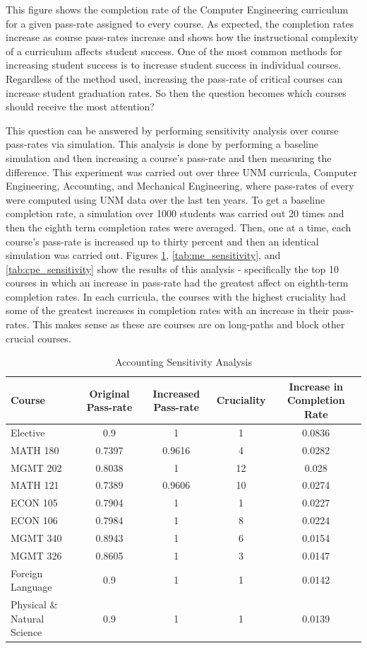 \documentclass[botnum, fleqn]{unmeethesis}
\begin{document}
    This figure shows the completion rate of the Computer Engineering curriculum for a given pass-rate assigned to every course. As expected, the completion rates increase as course pass-rates increase and shows how the instructional complexity of a curriculum affects student success. One of the most common methods for increasing student success is to increase student success in individual courses. Regardless of the method used, increasing the pass-rate of critical courses can increase student graduation rates. So then the question becomes which courses should receive the most attention?

    This question can be answered by performing sensitivity analysis over course pass-rates via simulation. This analysis is done by performing a baseline simulation and then increasing a course's pass-rate and then measuring the difference. This experiment was carried out over three UNM curricula, Computer Engineering, Accounting, and Mechanical Engineering, where pass-rates of every were computed using UNM data over the last ten years. To get a baseline completion rate, a simulation over 1000 students was carried out 20 times and then the eighth term completion rates were averaged. Then, one at a time, each course's pass-rate is increased up to thirty percent and then an identical simulation was carried out. Figures \ref{tab:accounting_sensitivity}, \ref{tab:me_sensitivity}, and \ref{tab:cpe_sensitivity} show the results of this analysis - specifically the top 10 courses in which an increase in pass-rate had the greatest affect on eighth-term completion rates. In each curricula, the courses with the highest cruciality had some of the greatest increases in completion rates with an increase in their pass-rates. This makes sense as these are courses are on long-paths and block other crucial courses.

    \begin{table}[!h]
    \tiny
    \begin{tabular}{l*{4}{c}}
    Course & Original Pass-rate & Increased Pass-rate & Cruciality & Increase in Completion Rate \\
    \hline
    Elective & 0.9 & 1 & 1 & 0.0836 \\
    MATH 180 & 0.7397 & 0.9616 & 4 & 0.0282 \\
    MGMT 202 & 0.8038 & 1 & 12 & 0.028 \\
    MATH 121 & 0.7389 & 0.9606 & 10 & 0.0274 \\
    ECON 105 & 0.7904 & 1 & 1 & 0.0227 \\
    ECON 106 & 0.7984 & 1 & 8 & 0.0224 \\
    MGMT 340 & 0.8943 & 1 & 6 & 0.0154 \\
    MGMT 326 & 0.8605 & 1 & 3 & 0.0147 \\
    Foreign Language & 0.9 & 1 & 1 & 0.0142 \\
    Physical \& Natural Science & 0.9 & 1 & 1 & 0.0139 \\
    \end{tabular}
    \caption{Accounting Sensitivity Analysis} 
    \label{tab:accounting_sensitivity}
    \end{table}
\end{document}
